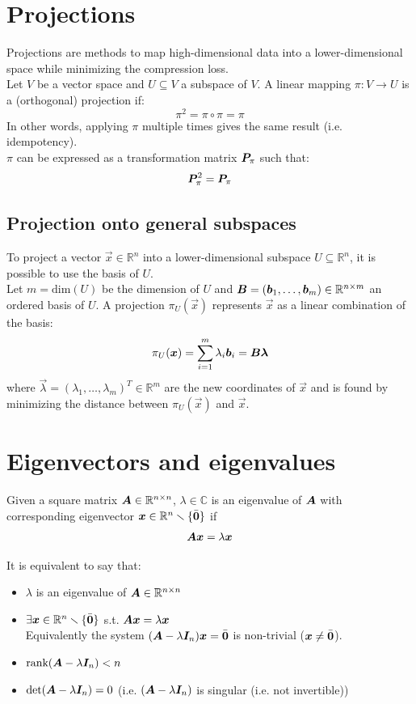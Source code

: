 \section{Projections}
Projections are methods to map high-dimensional data into a lower-dimensional space 
while minimizing the compression loss.\\
Let $V$ be a vector space and $U \subseteq V$ a subspace of $V$.
A linear mapping $\pi: V \rightarrow U$ is a (orthogonal) projection if:
\[ \pi^2 = \pi \circ \pi = \pi \]
In other words, applying $\pi$ multiple times gives the same result (i.e. idempotency).\\
$\pi$ can be expressed as a transformation matrix ${\bm{P}}_\pi$ such that:
\[ {\bm{P}}_\pi^2 = {\bm{P}}_\pi \] 

\subsection{Projection onto general subspaces} 
To project a vector $\vec{x} \in \mathbb{R}^n$ into a lower-dimensional subspace $U \subseteq \mathbb{R}^n$,
it is possible to use the basis of $U$.\\
%
Let $m = \text{dim}(U)$ be the dimension of $U$ and 
${\bm{B}} = ({\bm{b}}_1, \dots, {\bm{b}}_m) \in \mathbb{R}^{n \times m}$ an ordered basis of $U$.
A projection $\pi_U(\vec{x})$ represents $\vec{x}$ as a linear combination of the basis:
\[ \pi_U({\bm{x}}) = \sum_{i=1}^{m} \lambda_i {\bm{b}}_i = {\bm{B}}{\bm{\lambda}} \]
where $\vec{\lambda} = (\lambda_1, \dots, \lambda_m)^T \in \mathbb{R}^{m}$ are the new coordinates of $\vec{x}$ 
and is found by minimizing the distance between $\pi_U(\vec{x})$ and $\vec{x}$.



\section{Eigenvectors and eigenvalues}

Given a square matrix ${\bm{A}} \in \mathbb{R}^{n \times n}$, 
$\lambda \in \mathbb{C}$ is an eigenvalue of ${\bm{A}}$ 
with corresponding eigenvector ${\bm{x}} \in \mathbb{R}^n \smallsetminus \{ \bar{{\bm{0}}} \}$ if 
\[ {\bm{A}}{\bm{x}} = \lambda{\bm{x}} \]

It is equivalent to say that:
\begin{itemize}
    \item $\lambda$ is an eigenvalue of ${\bm{A}} \in \mathbb{R}^{n \times n}$
    \item $\exists {\bm{x}} \in \mathbb{R}^n \smallsetminus \{ \bar{{\bm{0}}} \}$ s.t. ${\bm{A}}{\bm{x}} = \lambda{\bm{x}}$ \\
        Equivalently the system $({\bm{A}} - \lambda {\bm{I}}_n){\bm{x}} = \bar{{\bm{0}}}$ is non-trivial (${\bm{x}} \neq \bar{{\bm{0}}}$).
    \item $\text{rank}({\bm{A}} - \lambda {\bm{I}}_n) < n$
    \item $\det({\bm{A}} - \lambda {\bm{I}}_n) = 0$ (i.e. $({\bm{A}} - \lambda {\bm{I}}_n)$ is singular {\footnotesize(i.e. not invertible)})
\end{itemize}

